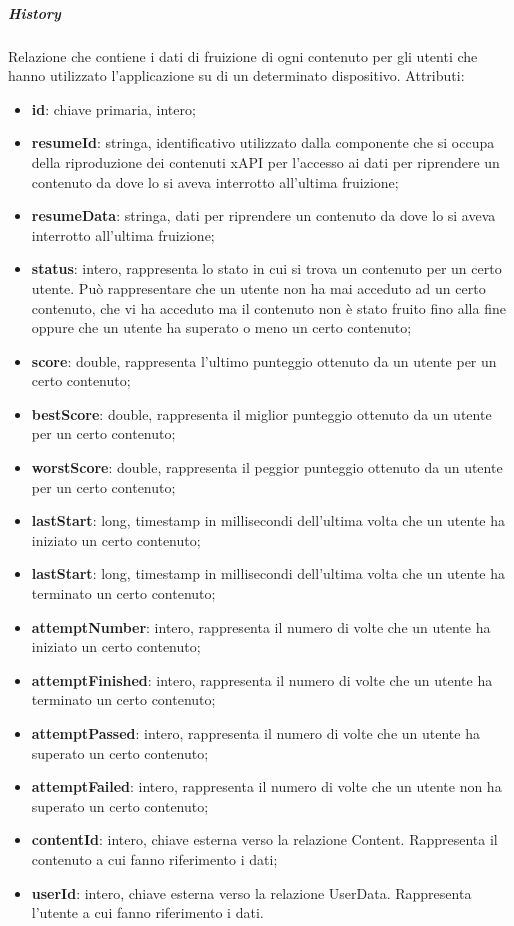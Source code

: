 \documentclass[../Tesi.tex]{subfiles}
\begin{document}
				\subparagraph*{History}
				Relazione che contiene i dati di fruizione di ogni contenuto per gli utenti che hanno utilizzato l'applicazione su di un determinato dispositivo. Attributi:
				\begin{itemize}
					\item \textbf{id}: chiave primaria, intero;
					\item \textbf{resumeId}: stringa, identificativo utilizzato dalla componente che si occupa della riproduzione dei contenuti xAPI per l'accesso ai dati per riprendere un contenuto da dove lo si aveva interrotto all'ultima fruizione;
					\item \textbf{resumeData}: stringa, dati per riprendere un contenuto da dove lo si aveva interrotto all'ultima fruizione;
					\item \textbf{status}: intero, rappresenta lo stato in cui si trova un contenuto per un certo utente. Può rappresentare che un utente non ha mai acceduto ad un certo contenuto, che vi ha acceduto ma il contenuto non è stato fruito fino alla fine oppure che un utente ha superato o meno un certo contenuto;
					\item \textbf{score}: double, rappresenta l'ultimo punteggio ottenuto da un utente per un certo contenuto;
					\item \textbf{bestScore}: double, rappresenta il miglior punteggio ottenuto da un utente per un certo contenuto;
					\item \textbf{worstScore}: double, rappresenta il peggior punteggio ottenuto da un utente per un certo contenuto;
					\item \textbf{lastStart}: long, timestamp in millisecondi dell'ultima volta che un utente ha iniziato un certo contenuto;
					\item \textbf{lastStart}: long, timestamp in millisecondi dell'ultima volta che un utente ha terminato un certo contenuto;
					\item \textbf{attemptNumber}: intero, rappresenta il numero di volte che un utente ha iniziato un certo contenuto;
					\item \textbf{attemptFinished}: intero, rappresenta il numero di volte che un utente ha terminato un certo contenuto;
					\item \textbf{attemptPassed}: intero, rappresenta il numero di volte che un utente ha superato un certo contenuto;
					\item \textbf{attemptFailed}: intero, rappresenta il numero di volte che un utente non ha superato un certo contenuto;
					\item \textbf{contentId}: intero, chiave esterna verso la relazione Content. Rappresenta il contenuto a cui fanno riferimento i dati;
					\item \textbf{userId}: intero, chiave esterna verso la relazione UserData. Rappresenta l'utente a cui fanno riferimento i dati.
				\end{itemize}
\end{document}
